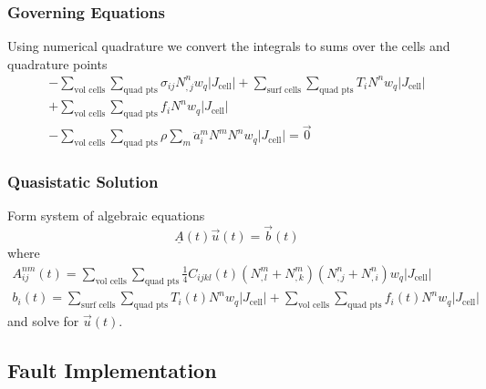 \documentclass{beamer}
\begin{document}
\begin{frame}
  \frametitle{Governing Equations}
  \summary{}

  Using numerical quadrature we convert the integrals to sums over the
  cells and quadrature points
  \begin{multline}
    -\sum_\text{vol cells} \sum_\text{quad pts} \sigma_{ij} N^n_{,j} w_q |J_\text{cell}|
    + \sum_\text{surf cells} \sum_\text{quad pts} T_i N^n w_q |J_\text{cell}|\\
    + \sum_\text{vol cells} \sum_\text{quad pts}  f_i N^n w_q |J_\text{cell}|\\
    - \sum_\text{vol cells} \sum_\text{quad pts} \rho \sum_m \ddot{a}^m_i N^m N^n w_q |J_\text{cell}| = \vec{0}    
  \end{multline}

\end{frame}


\begin{frame}
  \frametitle{Quasistatic Solution}

  \vfill
  Form system of algebraic equations
  \begin{equation}
    \underline{A} (t) \vec{u}(t) = \vec{b}(t)
  \end{equation}
  where
  \begin{gather}
    A^{nm}_{ij}(t) = \sum_\text{vol cells} \sum_\text{quad pts} 
      \frac{1}{4} C_{ijkl}(t) (N^m_{,l} + N^m_{,k})(N^n_{,j} + N^n_{,i}) w_q |J_\text{cell}| \\
    b_i(t) =    
     \sum_\text{surf cells} \sum_\text{quad pts} T_i(t) N^n w_q |J_\text{cell}| 
    + \sum_\text{vol cells} \sum_\text{quad pts}  f_i(t) N^n w_q |J_\text{cell}|
\end{gather}
  and solve for $\vec{u}(t)$.
  \vfill


\end{frame}


\subsection{Fault Implementation}
\end{document}
